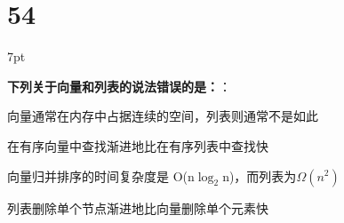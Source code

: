 \documentclass[UTF8]{report}
\theoremstyle{MyLineTheoremStyle} %
\theoremstyle{MyBlockTheoremStyle} %
\theoremstyle{MySubsubsectionStyle} %
\newenvironment{graybox}{%
        \def\FrameCommand{%
        \hspace{1pt}%
        {\color{gray}\small \vrule width 2pt}%
        {\color{graybox_color}\vrule width 4pt}%
        \colorbox{graybox_color}%
        }%
        \MakeFramed{\advance\hsize-\width\FrameRestore}%
        \noindent\hspace{-4.55pt}%
        \begin{adjustwidth}{}{7pt}%
        \vspace{2pt}\vspace{2pt}%
        }
        {%
        \vspace{2pt}\end{adjustwidth}\endMakeFramed%
        }
\begin{document}
\section*{54}

\begin{graybox}
\textbf{下列关于向量和列表的说法错误的是：}：
\begin{circledenum}
    \item 向量通常在内存中占据连续的空间，列表则通常不是如此
    \item 在有序向量中查找渐进地比在有序列表中查找快
    \item 向量归并排序的时间复杂度是 O(n$\log_{2}$n)，而列表为$\Omega(n^2)$
    \item 列表删除单个节点渐进地比向量删除单个元素快
\end{circledenum}
\end{graybox}
\end{document}
